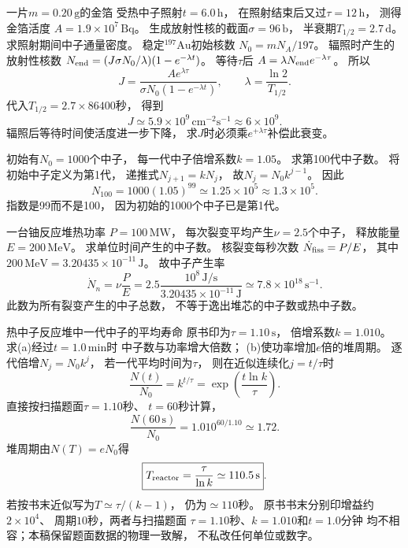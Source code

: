 一片$m=0.20\,\mathrm g$的金箔
受热中子照射$t=6.0\,\mathrm h$，
在照射结束后又过$\tau=12\,\mathrm h$，
测得金箔活度
$A=1.9\times10^7\,\mathrm{Bq}$。
生成放射性核的截面$\sigma=96\,\mathrm b$，
半衰期$T_{1/2}=2.7\,\mathrm d$。
求照射期间中子通量密度。
\exsolution
稳定$^{197}\mathrm{Au}$初始核数
$N_0=mN_A/197$。
辐照时产生的放射性核数
$N_{\rm end}=(J\sigma N_0/\lambda)
(1-e^{-\lambda t})$。
等待$\tau$后
$A=\lambda N_{\rm end}e^{-\lambda\tau}$。
所以
\[
 \boxed{J=\frac{A e^{\lambda\tau}}
 {\sigma N_0(1-e^{-\lambda t})}},\qquad
 \lambda=\frac{\ln2}{T_{1/2}}.
\]
代入$T_{1/2}=2.7\times86400$秒，
得到
\[
 \boxed{J\simeq5.9\times10^9\,
 \mathrm{cm^{-2}s^{-1}}\approx6\times10^9}.
\]
\excheck 辐照后等待时间使活度进一步下降，
求$J$时必须乘$e^{+\lambda\tau}$补偿此衰变。

初始有$N_0=1000$个中子，
每一代中子倍增系数$k=1.05$。
求第100代中子数。
\exsolution
将初始中子定义为第1代，
递推式$N_{j+1}=kN_j$，
故$N_j=N_0k^{j-1}$。
因此
\[
 \boxed{N_{100}=1000(1.05)^{99}
 \simeq1.25\times10^5\approx1.3\times10^5}.
\]
\excheck 指数是99而不是100，
因为初始的1000个中子已是第1代。

一台铀反应堆热功率
$P=100\,\mathrm{MW}$，
每次裂变平均产生$\nu=2.5$个中子，
释放能量$E=200\,\mathrm{MeV}$。
求单位时间产生的中子数。
\exsolution
核裂变每秒次数
$\dot N_{\rm fiss}=P/E$，
其中$200\,\mathrm{MeV}
=3.20435\times10^{-11}\,\mathrm J$。
故中子产生率
\[
 \boxed{\dot N_n=\nu\frac{P}{E}
 =2.5\frac{10^8\,\mathrm{J/s}}
 {3.20435\times10^{-11}\,\mathrm{J}}
 \simeq7.8\times10^{18}\,\mathrm{s^{-1}}}.
\]
\excheck 此数为所有裂变产生的中子总数，
不等于逸出堆芯的中子数或热中子数。

热中子反应堆中一代中子的平均寿命
原书印为$\tau=1.10\,\mathrm s$，
倍增系数$k=1.010$。
求(a)经过$t=1.0\,\mathrm{min}$时
中子数与功率增大倍数；
(b)使功率增加$e$倍的堆周期。
\exsolution
逐代倍增$N_j=N_0k^j$，
若一代平均时间为$\tau$，
则在近似连续化$j=t/\tau$时
\[
 \frac{N(t)}{N_0}=k^{t/\tau}
 =\exp\!\left(\frac{t\ln k}{\tau}\right).
\]
直接按扫描题面$\tau=1.10$秒、
$t=60$秒计算，
\[
 \boxed{\frac{N(60\,\mathrm s)}{N_0}
 =1.010^{60/1.10}\simeq1.72}.
\]
堆周期由$N(T)=eN_0$得
\[
 \boxed{T_{\rm reactor}=\frac{\tau}{\ln k}
 \simeq110.5\,\mathrm s}.
\]
若按书末近似写为$T\simeq\tau/(k-1)$，
仍为$\simeq110$秒。
\excheck 原书书末分别印增益约$2\times10^4$、
周期$10$秒，两者与扫描题面
$\tau=1.10$秒、$k=1.010$和$t=1.0$分钟
均不相容；本稿保留题面数据的物理一致解，
不私改任何单位或数字。
